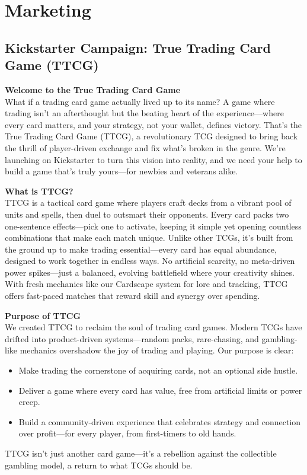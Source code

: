\chapter{Marketing}




\section{Kickstarter Campaign: True Trading Card Game (TTCG)}

\textbf{Welcome to the True Trading Card Game} \\
What if a trading card game actually lived up to its name? A game where trading isn’t an afterthought but the beating heart of the experience—where every card matters, and your strategy, not your wallet, defines victory. That’s the True Trading Card Game (TTCG), a revolutionary TCG designed to bring back the thrill of player-driven exchange and fix what’s broken in the genre. We’re launching on Kickstarter to turn this vision into reality, and we need your help to build a game that’s truly yours—for newbies and veterans alike.

\textbf{What is TTCG?} \\
TTCG is a tactical card game where players craft decks from a vibrant pool of units and spells, then duel to outsmart their opponents. Every card packs two one-sentence effects—pick one to activate, keeping it simple yet opening countless combinations that make each match unique. Unlike other TCGs, it’s built from the ground up to make trading essential—every card has equal abundance, designed to work together in endless ways. No artificial scarcity, no meta-driven power spikes—just a balanced, evolving battlefield where your creativity shines. With fresh mechanics like our Cardscape system for lore and tracking, TTCG offers fast-paced matches that reward skill and synergy over spending.

\textbf{Purpose of TTCG} \\
We created TTCG to reclaim the soul of trading card games. Modern TCGs have drifted into product-driven systems—random packs, rare-chasing, and gambling-like mechanics overshadow the joy of trading and playing. Our purpose is clear:
\begin{itemize}
    \item Make trading the cornerstone of acquiring cards, not an optional side hustle.
    \item Deliver a game where every card has value, free from artificial limits or power creep.
    \item Build a community-driven experience that celebrates strategy and connection over profit—for every player, from first-timers to old hands.
\end{itemize}
TTCG isn’t just another card game—it’s a rebellion against the collectible gambling model, a return to what TCGs should be.

